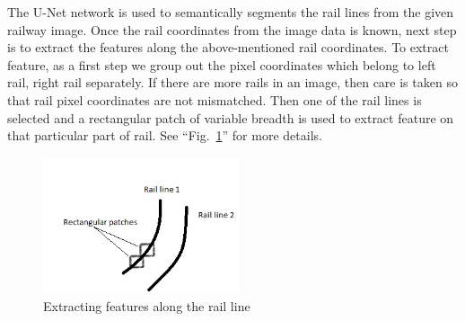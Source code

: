 \documentclass[conference]{IEEEtran}
\begin{document}
The U-Net network is used to semantically segments the rail lines from the given railway image. Once the rail coordinates from the image data is known, next step is to extract the features along the above-mentioned rail coordinates. To extract feature, as a first step we group out the pixel coordinates which belong to left rail, right rail separately. If there are more rails in an image, then care is taken so that rail pixel coordinates are not mismatched. Then one of the rail lines is selected and a rectangular patch of variable breadth is used to extract feature on that particular part of rail. See ``Fig.~\ref{Rail_line}'' for more details. 
\begin{figure}[htbp]
\centerline{\includegraphics[height=4cm]{Rail_line_illustration.png}}
\caption{Extracting features along the rail line}
\label{Rail_line}
\end{figure} 
\end{document}
